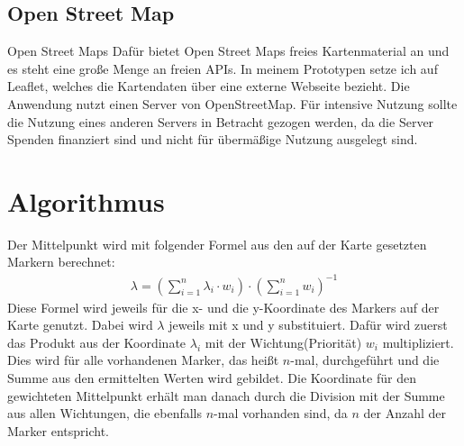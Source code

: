 \documentclass[a4paper, 12pt]{scrreprt}
\begin{document}
\section{Open Street Map}
Open Street Maps\cite{osm2}
Dafür bietet Open Street Maps freies Kartenmaterial an und es steht eine große Menge an freien APIs.
In meinem Prototypen setze ich auf Leaflet\cite{leaflet}, welches die Kartendaten über eine externe Webseite bezieht.
Die Anwendung nutzt einen Server von OpenStreetMap.
Für intensive Nutzung sollte die Nutzung eines anderen Servers in Betracht gezogen werden, da die Server Spenden finanziert sind und nicht für übermäßige Nutzung ausgelegt sind.\cite{osm}

\chapter{Algorithmus}
Der Mittelpunkt wird mit folgender Formel aus den auf der Karte gesetzten Markern berechnet:
\begin{eqnarray}
\lambda = \left(\sum_{i=1}^{n}\lambda_i \cdot w_i \right) \cdot \left(\sum_{i=1}^{n} w_i \right)^{-1}
\end{eqnarray}
Diese Formel wird jeweils für die x- und die y-Koordinate des Markers auf der Karte genutzt.
Dabei wird $\lambda$ jeweils mit x und y substituiert.
Dafür wird zuerst das Produkt aus der Koordinate $\lambda_i$ mit der Wichtung(Priorität) $w_i$ multipliziert.
Dies wird für alle vorhandenen Marker, das heißt $n$-mal, durchgeführt und die Summe aus den ermittelten Werten wird gebildet.
Die Koordinate für den gewichteten Mittelpunkt erhält man danach durch die Division mit der Summe aus allen Wichtungen, die ebenfalls $n$-mal vorhanden sind, da $n$ der Anzahl der Marker entspricht.
\end{document}
